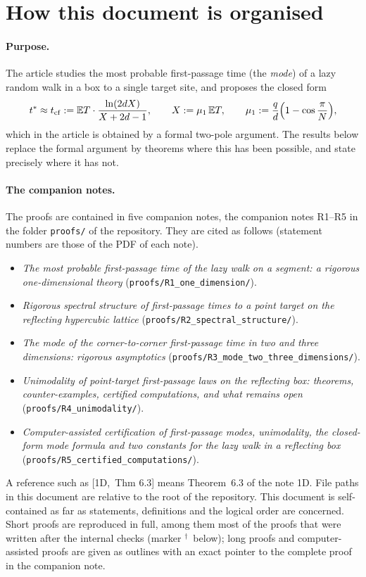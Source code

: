 \documentclass[10pt,a4paper]{article}
\theoremstyle{plain}
\theoremstyle{definition}
\newcommand{\NEW}{\ensuremath{^{\dagger}}}       %
\newcommand{\src}[2]{[\textsf{#1},~#2]}           %
\newcommand{\ONE}{\textsf{1D}}
\newcommand{\SPE}{\textsf{SP}}
\newcommand{\ASY}{\textsf{AS}}
\newcommand{\UNI}{\textsf{UN}}
\newcommand{\CER}{\textsf{CE}}
\newcommand{\E}{\mathbb{E}}
\begin{document}
\tableofcontents

\section{How this document is organised}\label{sec:intro}

\paragraph{Purpose.} The article studies the most probable first-passage time (the \emph{mode}) of a lazy random walk in a box to a single target site, and proposes the closed form
\[
t^*\approx t_{\rm cf}:=\E T\cdot\frac{\ln(2dX)}{X+2d-1},\qquad X:=\mu_1\,\E T,\qquad \mu_1:=\frac qd\Bigl(1-\cos\frac\pi N\Bigr),
\]
which in the article is obtained by a formal two-pole argument. The results below replace the formal argument by theorems where this has been possible, and state precisely where it has not.

\paragraph{The companion notes.} The proofs are contained in five companion notes, the companion notes R1--R5 in the folder \texttt{proofs/} of the repository. They are cited as follows (statement numbers are those of the PDF of each note).
\begin{itemize}
\item[\ONE] \emph{The most probable first-passage time of the lazy walk on a segment: a rigorous one-dimensional theory} (\texttt{proofs/\allowbreak R1\_one\_dimension/}).
\item[\SPE] \emph{Rigorous spectral structure of first-passage times to a point target on the reflecting hypercubic lattice} (\texttt{proofs/\allowbreak R2\_spectral\_structure/}).
\item[\ASY] \emph{The mode of the corner-to-corner first-passage time in two and three dimensions: rigorous asymptotics} (\texttt{proofs/\allowbreak R3\_mode\_two\_three\_dimensions/}).
\item[\UNI] \emph{Unimodality of point-target first-passage laws on the reflecting box: theorems, counter-examples, certified computations, and what remains open} (\texttt{proofs/\allowbreak R4\_unimodality/}).
\item[\CER] \emph{Computer-assisted certification of first-passage modes, unimodality, the closed-form mode formula and two constants for the lazy walk in a reflecting box} (\texttt{proofs/\allowbreak R5\_certified\_computations/}).
\end{itemize}
A reference such as \src{\ONE}{Thm 6.3} means Theorem~6.3 of the note \ONE. File paths in this document are relative to the root of the repository. This document is self-contained as far as statements, definitions and the logical order are concerned. Short proofs are reproduced in full, among them most of the proofs that were written after the internal checks (marker \NEW\ below); long proofs and computer-assisted proofs are given as outlines with an exact pointer to the complete proof in the companion note.
\end{document}
